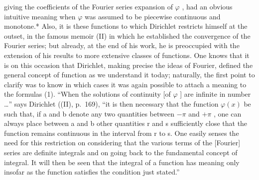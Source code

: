 giving the coefficients of the Fourier series expansion of \(\varphi\) , had an obvious intuitive meaning when \(\varphi\) was assumed to be piecewise continuous and monotone.* Also, it is these functions to which Dirichlet restricts himself at the outset, in the famous memoir (II) in which he established the convergence of the Fourier series; but already, at the end of his work, he is preoccupied with the extension of his results to more extensive classes of functions. One knows that it is on this occasion that Dirichlet, making precise the ideas of Fourier, defined the general concept of function as we understand it today; naturally, the first point to clarify was to know in which cases it was again possible to attach a meaning to the formulas (1). ``When the solutions of continuity {[}of \(\varphi\) {]} are infinite in number \ldots'' says Dirichlet ((II), p.~169), ``it is then necessary that the function \(\varphi(x)\) be such that, if a and b denote any two quantities between \(-\pi\) and \(+\pi\) , one can always place between a and b other quantities r and s sufficiently close that the function remains continuous in the interval from r to s. One easily senses the need for this restriction on considering that the various terms of the {[}Fourier{]} series are definite integrals and on going back to the fundamental concept of integral. It will then be seen that the integral of a function has meaning only insofar as the function satisfies the condition just stated.''

